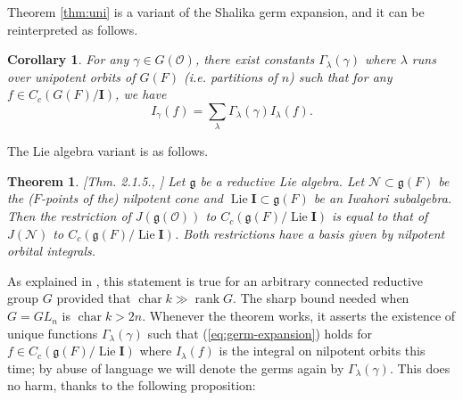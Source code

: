 \documentclass{amsart}
\numberwithin{equation}{section}
\newtheorem{theorem}[lemma]{Theorem}%
\newtheorem{corollary}[lemma]{Corollary}%
\theoremstyle{definition}
\DeclareMathOperator{\Lie}{Lie}
\newcommand{\cO}{\mathcal{O}}
\newcommand{\cN}{\mathcal{N}}
\newcommand{\fg}{\mathfrak{g}}
\newcommand{\bI}{\mathbf{I}}
\begin{document}
Theorem \ref{thm:uni} is a variant of the Shalika germ expansion, and it can be reinterpreted as follows.
\begin{corollary}
\label{cor:shalika} 
For any $\gamma\in G(\cO)$, there exist constants $\Gamma_{\lambda}(\gamma)$ where $\lambda$ runs over unipotent orbits of $G(F)$ (i.e. partitions of $n$) such that for any $f\in C_c(G(F)/\bI)$, we have
\begin{equation}\label{eq:germ-expansion}
I_\gamma(f)=\sum_{\lambda}\Gamma_{\lambda}(\gamma)I_\lambda(f).
\end{equation}
\end{corollary}

The Lie algebra variant is as follows. 
\begin{theorem}\label{thm:shalika-for-Lie-algebra} 
 [Thm. 2.1.5., \cite{DeBacker}] Let $\fg$ be a reductive Lie algebra. Let $\cN\subset\fg(F)$ be the ($F$-points of the) nilpotent cone and $\Lie \bI\subset \fg(F)$ be an Iwahori subalgebra. Then the restriction of $J(\fg(\cO))$ to $C_c(\fg(F)/\Lie \bI)$ is equal to that of $J(\cN)$ to $C_c(\fg(F)/\Lie \bI)$. Both restrictions have a basis given by nilpotent orbital integrals.
\end{theorem}

As explained in \cite{DeBacker}, this statement is true for an arbitrary connected reductive group $G$ provided that $\operatorname{char} k\gg\operatorname{rank} G$.
The sharp bound needed when $G=GL_n$ is $\operatorname{char} k>2n$. Whenever the theorem works, it asserts the existence of unique functions $\Gamma_{\lambda}(\gamma)$ such that (\ref{eq:germ-expansion}) holds for $f\in C_c(\fg(F)/\Lie \bI)$ where $I_{\lambda}(f)$ is the integral on nilpotent orbits this time; by abuse of language we will denote the germs again by $\Gamma_{\lambda}(\gamma)$. This does no harm, thanks to the following proposition:
\end{document}
